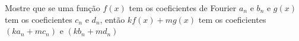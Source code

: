 \linespread{1.5}
Mostre que se uma função $f(x)$ tem os coeficientes de Fourier $a_n$ e $b_n$ e $g(x)$ tem os coeficientes $c_n$ e $d_n$, então $kf(x) + mg(x)$ tem os coeficientes $(ka_n + mc_n)$ e $(kb_n + md_n)$